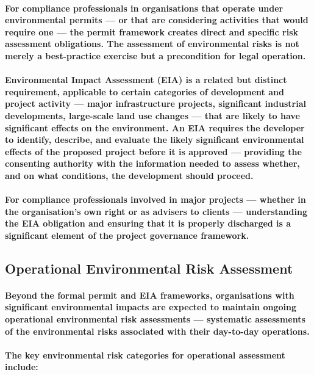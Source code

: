 \paragraph{For compliance professionals in organisations that operate under environmental permits — or that are considering activities that would require one — the permit framework creates direct and specific risk assessment obligations. The assessment of environmental risks is not merely a best-practice exercise but a precondition for legal operation.}
\paragraph{\textbf{Environmental Impact Assessment (EIA)} is a related but distinct requirement, applicable to certain categories of development and project activity — major infrastructure projects, significant industrial developments, large-scale land use changes — that are likely to have significant effects on the environment. An EIA requires the developer to identify, describe, and evaluate the likely significant environmental effects of the proposed project before it is approved — providing the consenting authority with the information needed to assess whether, and on what conditions, the development should proceed.}
\paragraph{For compliance professionals involved in major projects — whether in the organisation's own right or as advisers to clients — understanding the EIA obligation and ensuring that it is properly discharged is a significant element of the project governance framework.}

\subsection{Operational Environmental Risk Assessment}
\paragraph{Beyond the formal permit and EIA frameworks, organisations with significant environmental impacts are expected to maintain ongoing operational environmental risk assessments — systematic assessments of the environmental risks associated with their day-to-day operations.}
\paragraph{The key environmental risk categories for operational assessment include:}
